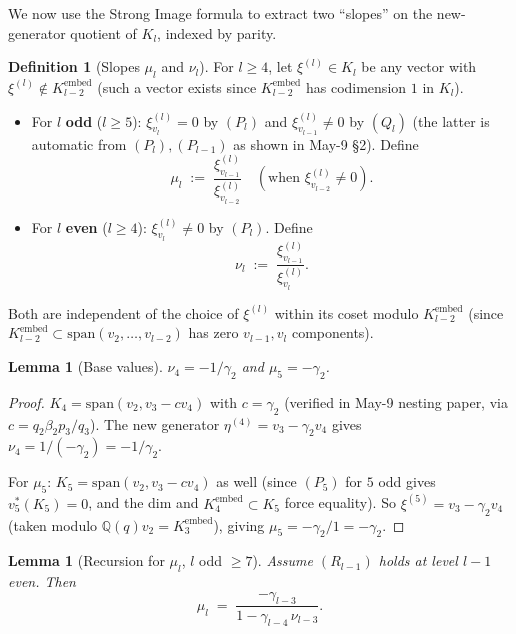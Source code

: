 \documentclass[11pt]{article}
\newtheorem{lemma}[theorem]{Lemma}
\theoremstyle{definition}
\newtheorem{definition}[theorem]{Definition}
\begin{document}
We now use the Strong Image formula to extract two ``slopes'' on the
new-generator quotient of $K_l$, indexed by parity.

\begin{definition}[Slopes $\mu_l$ and $\nu_l$]\label{def:slopes}
For $l \ge 4$, let $\xi^{(l)} \in K_l$ be any vector with
$\xi^{(l)} \notin K_{l-2}^{\mathrm{embed}}$ (such a vector exists
since $K_{l-2}^{\mathrm{embed}}$ has codimension $1$ in $K_l$).
\begin{itemize}[topsep=0.3em,itemsep=0.2em,leftmargin=2em]
\item For $l$ \textbf{odd} ($l \ge 5$): $\xi^{(l)}_{v_l} = 0$ by
  $(P_l)$ and $\xi^{(l)}_{v_{l-1}} \neq 0$ by $(Q_l)$ (the latter is
  automatic from $(P_l), (P_{l-1})$ as shown in May-9 \S2). Define
  \[
     \mu_l \;:=\; \frac{\xi^{(l)}_{v_{l-1}}}{\xi^{(l)}_{v_{l-2}}}
     \quad (\text{when } \xi^{(l)}_{v_{l-2}} \neq 0).
  \]
\item For $l$ \textbf{even} ($l \ge 4$): $\xi^{(l)}_{v_l} \neq 0$ by
  $(P_l)$.  Define
  \[
     \nu_l \;:=\; \frac{\xi^{(l)}_{v_{l-1}}}{\xi^{(l)}_{v_l}}.
  \]
\end{itemize}
Both are independent of the choice of $\xi^{(l)}$ within its coset
modulo $K_{l-2}^{\mathrm{embed}}$ (since $K_{l-2}^{\mathrm{embed}}
\subset \mathrm{span}(v_2,\ldots,v_{l-2})$ has zero $v_{l-1}, v_l$
components).
\end{definition}

\begin{lemma}[Base values]\label{lem:base-slopes}
$\nu_4 = -1/\gamma_2$ and $\mu_5 = -\gamma_2$.
\end{lemma}

\begin{proof}
$K_4 = \mathrm{span}(v_2, v_3 - c v_4)$ with $c = \gamma_2$ (verified
in May-9 nesting paper, via $c = q_2 \beta_2 p_3/q_3$).  The new
generator $\eta^{(4)} = v_3 - \gamma_2 v_4$ gives $\nu_4 = 1/(-\gamma_2) =
-1/\gamma_2$.

For $\mu_5$: $K_5 = \mathrm{span}(v_2, v_3 - c v_4)$ as well (since
$(P_5)$ for $5$ odd gives $v_5^*(K_5) = 0$, and the dim and
$K_4^{\mathrm{embed}} \subset K_5$ force equality).  So $\xi^{(5)} =
v_3 - \gamma_2 v_4$ (taken modulo $\mathbb{Q}(q) v_2 = K_3^{\mathrm{embed}}$),
giving $\mu_5 = -\gamma_2/1 = -\gamma_2$.
\end{proof}

\begin{lemma}[Recursion for $\mu_l$, $l$ odd $\ge 7$]\label{lem:mu-rec}
Assume $(R_{l-1})$ holds at level $l-1$ even.  Then
\begin{equation}\label{eq:mu-rec}
   \mu_l \;=\; \frac{-\gamma_{l-3}}{1 - \gamma_{l-4}\, \nu_{l-3}}.
\end{equation}
\end{lemma}
\end{document}
